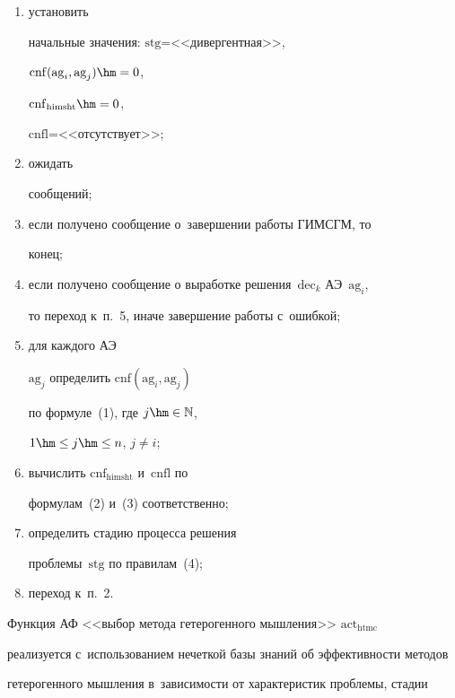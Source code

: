 \begin{enumerate}[(1)]


\item установить 


начальные значения: $\mathrm{stg}$\;=\;<<ди\-вер\-гент\-ная>>, 


$\mathrm{cnf}(\mathrm{ag}_i, \mathrm{ag}_j)\hm=0$, 


$\mathrm{cnf}_{\mathrm{himsht}}\hm=0$, 


$\mathrm{cnfl}$\;=\;<<{от\-сут\-ст\-ву\-ет}>>; 


\item ожидать 


сообщений; 


\item если получено сообщение о~завершении работы ГИМСГМ, то 


конец; 


\item если получено сообщение о выработке решения~$\mathrm{dec}_k$ АЭ~$\mathrm{ag}_i$, 


то переход к~п.~5, иначе завершение работы с~ошибкой; 


\item для каждого АЭ 


$\mathrm{ag}_j$ определить $\mathrm{cnf}(\mathrm{ag}_i, \mathrm{ag}_j)$ 


по формуле~(1), где $j\hm \in \mathbb{N}$, 


$1\hm\leq j\hm\leq n$, $j\not= i$; 


\item вычислить $\mathrm{cnf}_{\mathrm{himsht}}$ и~$\mathrm{cnfl}$ по 


формулам~(2) и~(3) соответственно; 


\item определить стадию процесса решения 


проблемы~$\mathrm{stg}$ по правилам~(4);


\item переход к~п.~2.


  \end{enumerate}


  


  Функция АФ <<выбор метода гетерогенного мышления>> $\mathrm{act}_{\mathrm{htmc}}$ 


реализуется с~использованием нечеткой базы знаний об эффективности методов 


гетерогенного мышления в~зависимости от характеристик проблемы, стадии 


